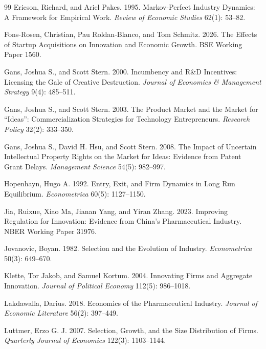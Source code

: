 \documentclass[12pt]{article}
\newcommand{\1}{\mathbf{1}}
\begin{document}
\begin{thebibliography}{99}
Ericson, Richard, and Ariel Pakes. 1995.
\newblock Markov-Perfect Industry Dynamics: A Framework for Empirical Work.
\newblock \emph{Review of Economic Studies} 62(1): 53--82.

Fons-Rosen, Christian, Pau Roldan-Blanco, and Tom Schmitz. 2026.
\newblock The Effects of Startup Acquisitions on Innovation and Economic Growth.
\newblock BSE Working Paper 1560.

Gans, Joshua S., and Scott Stern. 2000.
\newblock Incumbency and R\&D Incentives: Licensing the Gale of Creative Destruction.
\newblock \emph{Journal of Economics \& Management Strategy} 9(4): 485--511.

Gans, Joshua S., and Scott Stern. 2003.
\newblock The Product Market and the Market for ``Ideas'': Commercialization Strategies for Technology Entrepreneurs.
\newblock \emph{Research Policy} 32(2): 333--350.

Gans, Joshua S., David H. Hsu, and Scott Stern. 2008.
\newblock The Impact of Uncertain Intellectual Property Rights on the Market for Ideas: Evidence from Patent Grant Delays.
\newblock \emph{Management Science} 54(5): 982--997.

Hopenhayn, Hugo A. 1992.
\newblock Entry, Exit, and Firm Dynamics in Long Run Equilibrium.
\newblock \emph{Econometrica} 60(5): 1127--1150.

Jia, Ruixue, Xiao Ma, Jianan Yang, and Yiran Zhang. 2023.
\newblock Improving Regulation for Innovation: Evidence from China's Pharmaceutical Industry.
\newblock NBER Working Paper 31976.

Jovanovic, Boyan. 1982.
\newblock Selection and the Evolution of Industry.
\newblock \emph{Econometrica} 50(3): 649--670.

Klette, Tor Jakob, and Samuel Kortum. 2004.
\newblock Innovating Firms and Aggregate Innovation.
\newblock \emph{Journal of Political Economy} 112(5): 986--1018.

Lakdawalla, Darius. 2018.
\newblock Economics of the Pharmaceutical Industry.
\newblock \emph{Journal of Economic Literature} 56(2): 397--449.

Luttmer, Erzo G. J. 2007.
\newblock Selection, Growth, and the Size Distribution of Firms.
\newblock \emph{Quarterly Journal of Economics} 122(3): 1103--1144.

\end{thebibliography}
\end{document}
